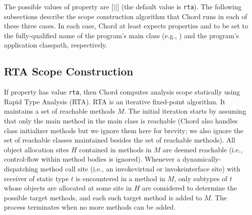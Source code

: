 The possible values of property  are
[$|$$|$] (the default value is {\tt rta}).
The following subsections describe the scope construction algorithm
that Chord runs in each of these three cases.
In each case, Chord at
least expects properties  and
 to be set to the fully-qualified name of the
program's main class (e.g., ) and the
program's application classpath, respectively.

\subsection{RTA Scope Construction}

If property  has value {\tt rta}, then Chord
computes analysis scope statically using Rapid Type Analysis (RTA).
RTA is an iterative fixed-point algorithm.  It maintains a set of
reachable methods $M$.  The initial iteration starts by assuming that
only the main method in the main class is reachable (Chord also
handles class initializer methods but we ignore them here for brevity;
we also ignore the set of reachable classes maintained besides the set
of reachable methods).  All object allocation sites $H$ contained in
methods in $M$ are deemed reachable (i.e., control-flow within method
bodies is ignored).  Whenever a dynamically-dispatching method call
site (i.e., an invokevirtual or invokeinterface site) with receiver of
static type $t$ is encountered in a method in $M$, only subtypes of
$t$ whose objects are allocated at some site in $H$ are considered to
determine the possible target methods, and each such target method is
added to $M$.  The process terminates when no more methods can be
added.


